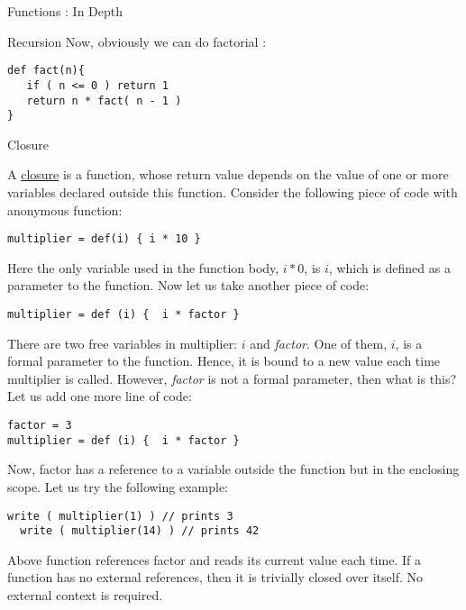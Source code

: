 \begin{section}{Functions : In Depth}
\begin{subsection}{Recursion}
Now, obviously we can do factorial :
\begin{lstlisting}[style=JexlStyle]
def fact(n){
   if ( n <= 0 ) return 1 
   return n * fact( n - 1 )
}
\end{lstlisting}

\end{subsection}

\begin{subsection}{Closure}

A \href{https://en.wikipedia.org/wiki/Closure_(computer_programming)}{closure} 
is a function, whose return value depends on the value of one or more variables declared outside this function. 
Consider the following piece of code with anonymous function:

\begin{lstlisting}[style=JexlStyle]
multiplier = def(i) { i * 10 }
\end{lstlisting}

Here the only variable used in the function body, $i * 0$, is $i$, which is defined as a parameter to the function. 
Now let us take another piece of code:

\begin{lstlisting}[style=JexlStyle]
multiplier = def (i) {  i * factor } 
\end{lstlisting}

There are two free variables in multiplier: $i$ and \emph{factor}. One of them, $i$, is a formal parameter to the function. 
Hence, it is bound to a new value each time multiplier is called. 
However, \emph{factor} is not a formal parameter, then what is this? 
Let us add one more line of code:

\begin{lstlisting}[style=JexlStyle]
factor = 3
multiplier = def (i) {  i * factor } 
\end{lstlisting}

Now, factor has a reference to a variable outside the function but in the enclosing scope. Let us try the following example:

\begin{lstlisting}[style=JexlStyle]
  write ( multiplier(1) ) // prints 3 
  write ( multiplier(14) ) // prints 42 
\end{lstlisting}
  
Above function references factor and reads its current value each time. 
If a function has no external references, then it is trivially closed over itself. No external context is required.


\end{subsection}
\end{section}

